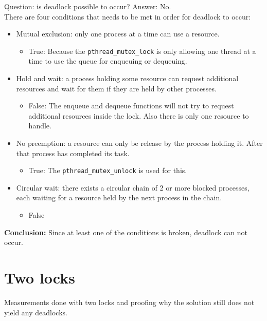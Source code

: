 \documentclass[a4paper,11pt,twoside,fleqn]{article}
\begin{document}
Question: is deadlock possible to occur? Answer: No.
\\
There are four conditions that needs to be met in order for deadlock to occur:
\begin{itemize}

\item
Mutual exclusion: only one process at a time can use a resource.
\begin{itemize} \item True: Because the \verb+pthread_mutex_lock+ is only allowing one thread at a time to use the queue for enqueuing or dequeuing.
\end{itemize}

\item Hold and wait: a process holding some resource can request additional resources and wait for them if they are held by other processes.
\begin{itemize}
\item False: The enqueue and dequeue functions will not try to request additional resources inside the lock. Also there is only one resource to handle.
\end{itemize}

\item No preemption: a resource can only be release by the process holding it. After that process has completed its task.
\begin{itemize}
\item True: The \verb+pthread_mutex_unlock+ is used for this.
\end{itemize} 

\item Circular wait: there exists a circular chain of 2 or more blocked processes, each waiting for a resource held by the next process in the chain.

\begin{itemize}
\item False
\end{itemize} 
\end{itemize}

\textbf{Conclusion:} Since at least one of the conditions is broken, deadlock can not occur.

\clearpage


\section{Two locks}
Measurements done with two locks and proofing why the solution still does not yield any deadlocks.
\end{document}
